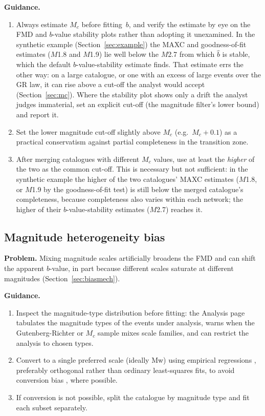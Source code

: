\documentclass[12pt]{article}
\begin{document}
\textbf{Guidance.}
\begin{enumerate}[leftmargin=*]
  \item Always estimate $M_c$ before fitting~$b$, and verify the estimate by eye
    on the FMD and $b$-value stability plots rather than adopting it
    unexamined.  In the synthetic example (Section~\ref{sec:example}) the MAXC
    and goodness-of-fit estimates ($M$1.8 and $M$1.9) lie well below the
    $M$2.7 from which $\hat{b}$ is stable, which the default
    $b$-value-stability estimate finds.  That estimate errs the other way: on a
    large catalogue, or one with an excess of large events over the GR law, it
    can rise above a cut-off the analyst would accept (Section~\ref{sec:mc}).
    Where the stability plot shows only a drift the analyst judges immaterial,
    set an explicit cut-off (the magnitude filter's lower bound) and report it.
  \item Set the lower magnitude cut-off slightly above $M_c$ (e.g.\ $M_c + 0.1$)
    as a practical conservatism against partial completeness in the transition
    zone.
  \item After merging catalogues with different $M_c$ values, use at least the
    \emph{higher} of the two as the common cut-off.  This is necessary but not
    sufficient: in the synthetic example the higher of the two catalogues' MAXC
    estimates ($M$1.8, or $M$1.9 by the goodness-of-fit test) is still below the
    merged catalogue's completeness, because completeness also varies within each
    network; the higher of their $b$-value-stability estimates ($M$2.7) reaches
    it.
\end{enumerate}

\subsection{Magnitude heterogeneity bias}

\textbf{Problem.}  Mixing magnitude scales artificially broadens the FMD and can
shift the apparent $b$-value, in part because different scales saturate at
different magnitudes (Section~\ref{sec:biasmech}).

\textbf{Guidance.}
\begin{enumerate}[leftmargin=*]
  \item Inspect the magnitude-type distribution before fitting: the Analysis
    page tabulates the magnitude types of the events under analysis, warns when
    the Gutenberg-Richter or $M_c$ sample mixes scale families, and can restrict
    the analysis to chosen types.
  \item Convert to a single preferred scale (ideally Mw) using empirical
    regressions \citep{das2011,hanks1979}, preferably orthogonal rather than
    ordinary least-squares fits, to avoid conversion bias
    \citep{castellaro2006,lolli2012}, where possible.
  \item If conversion is not possible, split the catalogue by magnitude type
    and fit each subset separately.
\end{enumerate}
\end{document}
